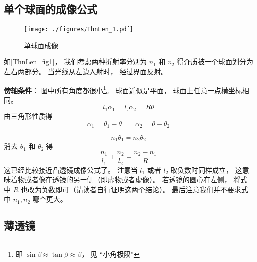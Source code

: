 


\subsection{单个球面的成像公式}
\begin{figure}[ht]
\centering
\texttt{[image: ./figures/ThnLen\_1.pdf]}
\caption{单球面成像} \label{ThnLen_fig1}
\end{figure}

如\autoref{ThnLen_fig1}， 我们考虑两种折射率分别为 $n_1$ 和 $n_2$ 得介质被一个球面划分为左右两部分。 当光线从左边入射时， 经过界面反射。

\textbf{傍轴条件}： 图中所有角度都很小\footnote{即 $\sin\beta \approx \tan\beta \approx \beta$， 见 “小角极限”}。 球面近似是平面， 球面上任意一点横坐标相同。
\begin{equation}
l_1 \alpha_1 = l_2 \alpha_2 = R\theta
\end{equation}
由三角形性质得
\begin{equation}
\alpha_1 = \theta_1 - \theta \qquad
\alpha_2 = \theta - \theta_2
\end{equation}

\begin{equation}
n_1 \theta_1 = n_2 \theta_2
\end{equation}
消去 $\theta_1$ 和 $\theta_2$ 得
\begin{equation}
\frac{n_1}{l_1} + \frac{n_2}{l_2} = \frac{n_2 - n_1}{R}
\end{equation}
这已经比较接近凸透镜成像公式了。 注意当 $l_1$ 或者 $l_2$ 取负数时同样成立， 这意味着物或者像在透镜的另一侧（即虚物或者虚像）。 若透镜的圆心在左侧， 将式中 $R$ 也改为负数即可（请读者自行证明这两个结论）。 最后注意我们并不要求式中 $n_1, n_2$ 哪个更大。

\subsection{薄透镜}

